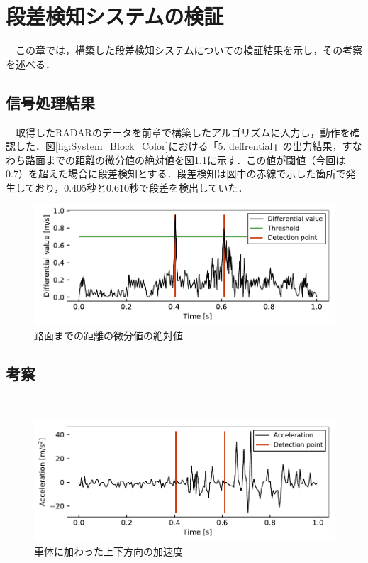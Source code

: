 \chapter{段差検知システムの検証}
　この章では，構築した段差検知システムについての検証結果を示し，その考察を述べる．

\section{信号処理結果}
　取得したRADARのデータを前章で構築したアルゴリズムに入力し，動作を確認した．図\ref{fig:System_Block_Color}における「5. deffrential」の出力結果，すなわち路面までの距離の微分値の絶対値を図\ref{fig:result_radar}に示す．この値が閾値（今回は0.7）を超えた場合に段差検知とする．段差検知は図中の赤線で示した箇所で発生しており，0.405秒と0.610秒で段差を検出していた．
\begin{figure}[H]
    \centering
    \includegraphics[width=11.5cm]{./fig/result_radar.pdf}
    \caption{路面までの距離の微分値の絶対値}
    \label{fig:result_radar}
\end{figure}

\section{考察}
　

\begin{figure}[H]
    \centering
    \includegraphics[width=11.5cm]{./fig/result_acc.pdf}
    \caption{車体に加わった上下方向の加速度}
    \label{fig:result_acc}
\end{figure}
